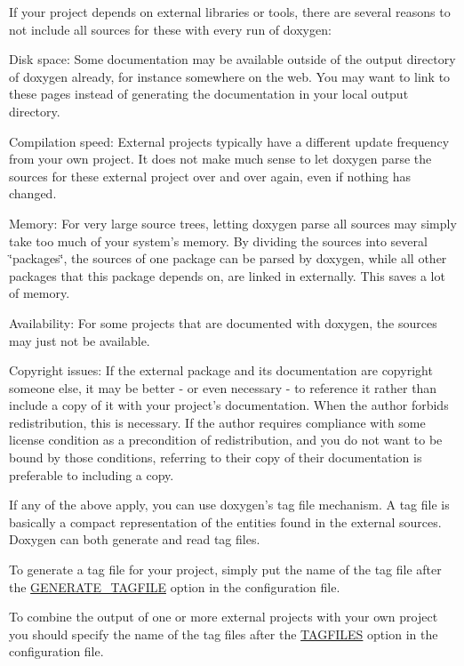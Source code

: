 If your project depends on external libraries or tools, there are several reasons to not include all sources for these with every run of doxygen:


\begin{DoxyDescription}
\item[Disk space:]Some documentation may be available outside of the output directory of doxygen already, for instance somewhere on the web. You may want to link to these pages instead of generating the documentation in your local output directory. 
\item[Compilation speed:]External projects typically have a different update frequency from your own project. It does not make much sense to let doxygen parse the sources for these external project over and over again, even if nothing has changed. 
\item[Memory:]For very large source trees, letting doxygen parse all sources may simply take too much of your system's memory. By dividing the sources into several \char`\"{}packages\char`\"{}, the sources of one package can be parsed by doxygen, while all other packages that this package depends on, are linked in externally. This saves a lot of memory. 
\item[Availability:]For some projects that are documented with doxygen, the sources may just not be available. 
\item[Copyright issues:]If the external package and its documentation are copyright someone else, it may be better -\/ or even necessary -\/ to reference it rather than include a copy of it with your project's documentation. When the author forbids redistribution, this is necessary. If the author requires compliance with some license condition as a precondition of redistribution, and you do not want to be bound by those conditions, referring to their copy of their documentation is preferable to including a copy.


\end{DoxyDescription}

If any of the above apply, you can use doxygen's tag file mechanism. A tag file is basically a compact representation of the entities found in the external sources. Doxygen can both generate and read tag files.

To generate a tag file for your project, simply put the name of the tag file after the \hyperlink{config_cfg_generate_tagfile}{GENERATE\_\-TAGFILE} option in the configuration file.

To combine the output of one or more external projects with your own project you should specify the name of the tag files after the \hyperlink{config_cfg_tagfiles}{TAGFILES} option in the configuration file.

